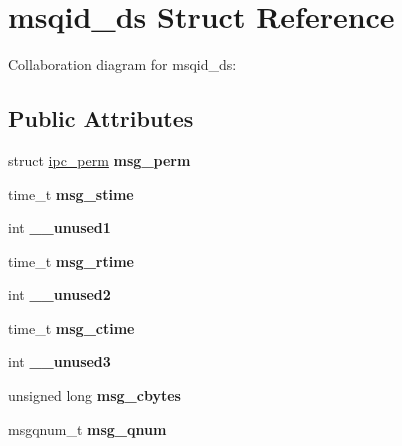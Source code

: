 \hypertarget{structmsqid__ds}{}\section{msqid\+\_\+ds Struct Reference}
\label{structmsqid__ds}


Collaboration diagram for msqid\+\_\+ds\+:
\subsection*{Public Attributes}
\begin{DoxyCompactItemize}
\item 
\mbox{\label{structmsqid__ds_a33a3d73a213402e13339cab9522363ea}} 
struct \mbox{\hyperlink{structipc__perm}{ipc\+\_\+perm}} {\bfseries msg\+\_\+perm}
\item 
\mbox{\label{structmsqid__ds_a40c0fdfbaccf4f441285ff9699cbb2a2}} 
time\+\_\+t {\bfseries msg\+\_\+stime}
\item 
\mbox{\label{structmsqid__ds_a2882af21b7f6e9b476dad4ff98f469a3}} 
int {\bfseries \+\_\+\+\_\+unused1}
\item 
\mbox{\label{structmsqid__ds_a24e1a13f1e4c6e447523ba7bc9a1379b}} 
time\+\_\+t {\bfseries msg\+\_\+rtime}
\item 
\mbox{\label{structmsqid__ds_afff0d15d2c6d4b04cdf0d8859cf0cb21}} 
int {\bfseries \+\_\+\+\_\+unused2}
\item 
\mbox{\label{structmsqid__ds_a12ddd46b9dd56d12005e954e7940076e}} 
time\+\_\+t {\bfseries msg\+\_\+ctime}
\item 
\mbox{\label{structmsqid__ds_a7707b089a0e6ebc93612251ebd781b66}} 
int {\bfseries \+\_\+\+\_\+unused3}
\item 
\mbox{\label{structmsqid__ds_ac61230594c72b00c6b5bee6eab9ebec0}} 
unsigned long {\bfseries msg\+\_\+cbytes}
\item 
\mbox{\label{structmsqid__ds_a4d28178ca8f65ba534008e2ca5198a2d}} 
msgqnum\+\_\+t {\bfseries msg\+\_\+qnum}

\end{DoxyCompactItemize}
